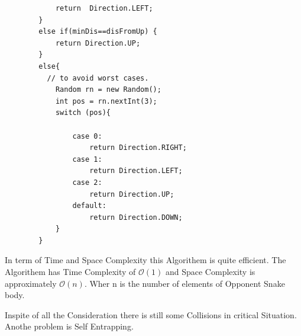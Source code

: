 \documentclass[a4paper,12pt]{article}
\begin{document}
\begin{verbatim}
            return  Direction.LEFT;
        }
        else if(minDis==disFromUp) {
            return Direction.UP;
        }
        else{
          // to avoid worst cases.
            Random rn = new Random();
            int pos = rn.nextInt(3);
            switch (pos){

                case 0:
                    return Direction.RIGHT;
                case 1:
                    return Direction.LEFT;
                case 2:
                    return Direction.UP;
                default:
                    return Direction.DOWN;
            }
        }

\end{verbatim}
In term of Time and Space Complexity this Algorithem is quite efficient. The Algorithem has Time Complexity of $\mathcal{O}(1)$ and Space
Complexity is approximately $\mathcal{O}(n)$. Wher n is the number of elements of Opponent Snake body. 

Inspite of all the Consideration there is still some Collisions in critical Situation. Anothe problem is Self Entrapping. 
\end{document}
